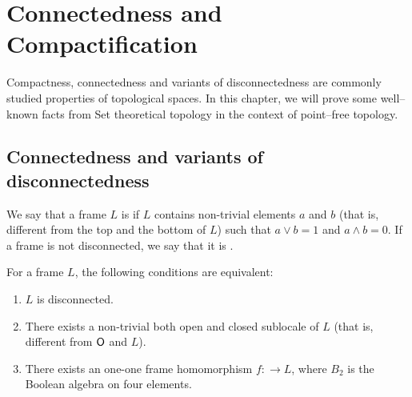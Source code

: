 \chapter{Connectedness and Compactification}

Compactness, connectedness and variants of disconnectedness are commonly studied properties of topological spaces.
In this chapter, we will prove some well--known facts from Set theoretical topology in the context of point--free topology.

\section{Connectedness and variants of disconnectedness}
\begin{definition}
    We say that a frame $L$ is  if $L$ contains non-trivial elements $a$ and $b$ (that is, different from the top and the bottom of $L$) such that $a\vee b = 1$ and $a\wedge b = 0$. If a frame is not disconnected, we say that it is .
\end{definition}

\begin{observation}\label{p:disconnectednessEquivalently}
    For a frame $L$, the following conditions are equivalent:

    \begin{enumerate}
        \item $L$ is disconnected.
        \item There exists a non-trivial both open and closed sublocale of $L$ (that is, different from $\mathsf{O}$ and $L$).
        \item There exists an one-one frame homomorphism $f\colon $$ \to L$, where $B_2$ is the Boolean algebra on four elements.
    \end{enumerate}
\end{observation}

